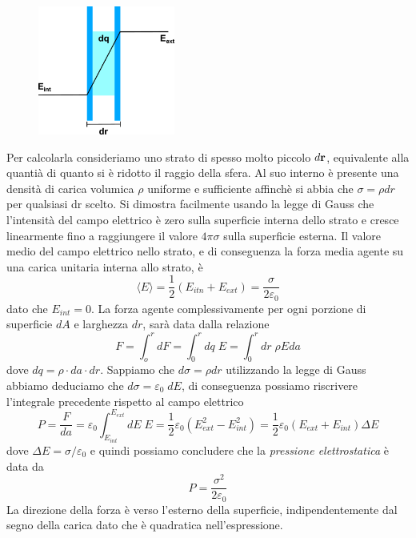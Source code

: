 \begin{figure} %
    \centering
    \includegraphics[width=0.4\textwidth]{images/superficie} %
\end{figure}
Per calcolarla consideriamo uno strato di spesso molto piccolo $d\bold{r}$, equivalente alla quanti\`a di quanto si \`e ridotto il raggio della sfera. Al suo interno \`e presente una densit\`a di carica volumica $\rho$ uniforme e sufficiente affinch\`e si abbia che $ \sigma = \rho dr $ per qualsiasi dr scelto. Si dimostra facilmente usando la legge di Gauss che l'intensit\`a del campo elettrico \`e zero sulla superficie interna dello strato e cresce linearmente fino a raggiungere il valore $4 \pi \sigma $ sulla superficie esterna. 
Il valore medio del campo elettrico nello strato, e di conseguenza la forza media agente su una carica unitaria interna allo strato, \`e 
\begin{equation*}
	\langle E \rangle = \frac{1}{2}(E_{itn} + E_{ext}) = \frac{\sigma}{2\varepsilon_0} 
\end{equation*}
dato che $E_{int} = 0$. La forza agente complessivamente per ogni porzione di superficie $dA$ e larghezza $dr$, sar\`a data dalla relazione 
\begin{equation*}
	F = \int_{o}^{r}dF = \int_{0}^{r}dq \; E = \int_0^r dr\; \rho E da
\end{equation*}
 dove $dq = \rho \cdot da \cdot dr$. Sappiamo che $d\sigma = \rho dr$ utilizzando la legge di Gauss abbiamo deduciamo che $d \sigma = \varepsilon_0 \;dE$, di conseguenza possiamo riscrivere l'integrale precedente rispetto al campo elettrico
 \begin{equation*}
 	P = \frac{F}{da} = \varepsilon_0 \int_{E_{int}}^{E_{ext}} dE \; E = \frac{1}{2} \varepsilon_0 (E_{ext}^2-E_{int}^2) = \frac{1}{2} \varepsilon_0(E_{ext} + E_{int})\Delta E
 \end{equation*}
 dove $\Delta E = \sigma / \varepsilon_0$ e quindi possiamo concludere che la \textit{pressione elettrostatica} \`e data da 
 \begin{equation*}
 	P = \frac{\sigma^2}{2 \varepsilon_0}
 \end{equation*}
 La direzione della forza \`e verso l'esterno della superficie, indipendentemente dal segno della carica dato che \`e quadratica nell'espressione.
 
